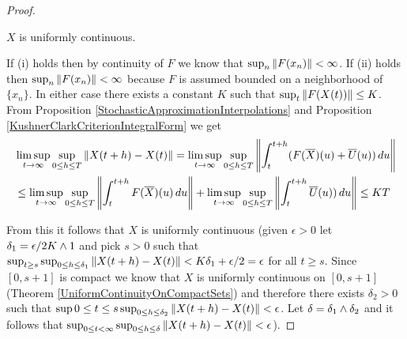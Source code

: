 \begin{proof}
\begin{clm}\label{KushnerClarkImpliesPseudotrajectory:UniformContinuity} $X$ is uniformly continuous.
\end{clm}
If (i) holds then by continuity of $F$ we know that $\sup_n \left \lVert F(x_n) \right \rVert < \infty$.  If (ii) holds then  $\sup_n \left \lVert F(x_n) \right \rVert < \infty$  because $F$ is assumed bounded on a neighborhood of $\lbrace x_n \rbrace$.  In either case there exists a constant $K$ such that $\sup_t \left \lVert F(X(t)) \right \rVert \leq K$.  From Proposition \ref{StochasticApproximationInterpolations} and Proposition \ref{KushnerClarkCriterionIntegralForm} we get
\begin{align*}
&\limsup_{t \to \infty} \sup_{0 \leq h \leq T} \left \lVert X(t+h) - X(t) \right \rVert = \limsup_{t \to \infty}\sup_{0 \leq h \leq T} \left \lVert \int_t^{t+h} (F(\overline{X})(u) + \overline{U}(u)) \, du \right \rVert \\
&\leq \limsup_{t \to \infty}\sup_{0 \leq h \leq T} \left \lVert \int_t^{t+h} F(\overline{X})(u) \, du \right \rVert + \limsup_{t \to \infty} \sup_{0 \leq h \leq T}\left \lVert \int_t^{t+h} \overline{U}(u)) \, du \right \rVert \leq KT
\end{align*}

From this it follows that $X$ is uniformly continuous (given $\epsilon > 0$ let $\delta_1 = \epsilon/2K  \wedge 1$ and pick $s>0$ such that $\sup_{t \geq s} \sup_{0 \leq h \leq \delta_1} \left \lVert X(t+h) - X(t) \right \rVert < K\delta_1 + \epsilon/2 = \epsilon$ for all $t\geq s$.  Since $[0,s+1]$ is compact we know that $X$ is uniformly continuous on $[0,s+1]$ (Theorem \ref{UniformContinuityOnCompactSets}) and  therefore there exists $\delta_2>0$ such that $\sup{0 \leq t \leq s} \sup_{0 \leq h \leq \delta_2} \left \lVert X(t+h) - X(t) \right \rVert < \epsilon$.  Let $\delta= \delta_1 \wedge \delta_2$ and it follows that $\sup_{0 \leq t < \infty} \sup_{0 \leq h \leq \delta} \left \lVert X(t+h) - X(t) \right \rVert < \epsilon$).


\end{proof}
